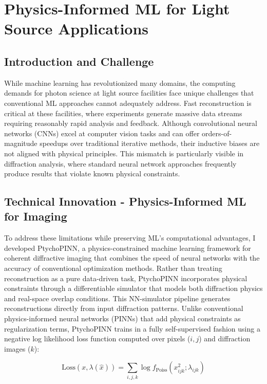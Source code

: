 \documentclass{article}
\begin{document}
\section{Physics-Informed ML for Light Source Applications}
\subsection{Introduction and Challenge}
While machine learning has revolutionized many domains, the computing demands for photon science at light source facilities face unique challenges that conventional ML approaches cannot adequately address. Fast reconstruction is critical at these facilities, where experiments generate massive data streams requiring reasonably rapid analysis and feedback. Although convolutional neural networks (CNNs) excel at computer vision tasks and can offer orders-of-magnitude speedups over traditional iterative methods, their inductive biases are not aligned with physical principles. This mismatch is particularly visible in diffraction analysis, where standard neural network approaches frequently produce results that violate known physical constraints. \cite{hoidn2023physics}

\subsection{Technical Innovation - Physics-Informed ML for Imaging}
To address these limitations while preserving ML's computational advantages, I developed PtychoPINN, a physics-constrained machine learning framework for coherent diffractive imaging that combines the speed of neural networks with the accuracy of conventional optimization methods. Rather than treating reconstruction as a pure data-driven task, PtychoPINN incorporates physical constraints through a differentiable simulator that models both diffraction physics and real-space overlap conditions. This NN-simulator pipeline generates reconstructions directly from input diffraction patterns. Unlike conventional physics-informed neural networks (PINNs) that add physical constraints as regularization terms, PtychoPINN trains in a fully self-supervised fashion using a negative log likelihood loss function computed over pixels ($i, j$) and diffraction images ($k$):

\begin{equation}
\text{Loss}(x, \lambda(\hat{x})) = \sum_{i,j,k} \log f_{\text{Poiss}}(x_{ijk}^2; \lambda_{ijk})
\end{equation}
\end{document}

